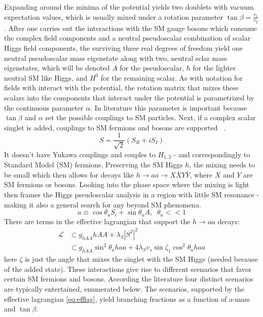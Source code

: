 Expanding around the minima of the potential yields two doublets with vacuum expectation values, which is usually mixed under a rotation parameter $\tan \beta = \frac{v_1}{v_2}$. After one carries out the interactions with the SM gauge bosons which consume the complex field components and a neutral pseudoscalar combination of scalar Higgs field components, the surviving three real degrees of freedom yield one neutral pseudoscalar mass eigenstate along with two, neutral sclar mass eigenstates, which will be denoted $A$ for the pseudoscalar, $h$ for the lighter neutral SM like Higgs, and $H^0$ for the remaining scalar. As with notation for fields with interact with the potential, the rotation matrix that mixes these scalars into the components that interact under the potential is parametrized by the continuous parameter $\alpha$. In literature this parameter is important because $\tan \beta$ and $\alpha$ set the possible couplings to SM particles. Next, if a complex scalar singlet is added, couplings to SM fermions and bosons are supported ~\cite{Curtin_2014}.
\[S = \frac{1}{\sqrt{2}}(S_R + iS_I)\]
It doesn't have Yukawa couplings and couples to $H_{1,2}$ - and correspondingly to Standard Model (SM) fermions. Preserving the SM Higgs $h$, the mixing needs to be small which then allows for decays like $h\rightarrow aa \rightarrow X\bar{X}Y\bar{Y}$, where $X$ and $Y$ are SM fermions or bosons. Looking into the phase space where the mixing is light then frames the Higgs pseudoscalar analysis in a region with little SM resonance - making it also a general search for any beyond SM phenomena.
\[a \equiv \cos \theta_a S_i + \sin \theta_a A ,\;\; \theta_a << 1 \]
There are terms in the effective lagrangian that support the $h \rightarrow aa $ decays:
\begin{align}
\label{eq:efflag}
\mathcal{L} &\subset g_{hAA}hAA + \lambda_S|S^2|^2  \\
            &\subset g_{hAA}\sin^2\theta_a haa + 4\lambda_S v_s \sin{\zeta_1} \cos^2\theta_a haa \nonumber 
\end{align}
here $\zeta$ is just the angle that mixes the singlet with the SM Higgs (needed because of the added state). These interactions give rise to different scenarios that favor certain SM fermions and bosons. According the literature four distinct scenarios are typically entertained, enumerated below. The scenarios, supported by the effective lagrangian \ref{eq:efflag}, yield branching fractions as a function of a-mass and $\tan\beta$.  

